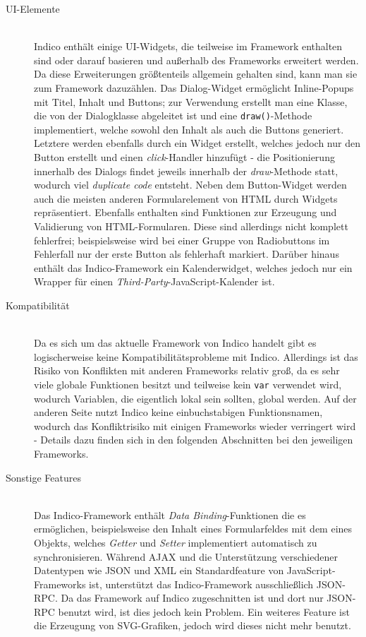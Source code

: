 \begin{description}
\item[UI-Elemente] \hfill \\
Indico enthält einige UI-Widgets, die teilweise im Framework enthalten sind oder darauf basieren und
außerhalb des Frameworks erweitert werden. Da diese Erweiterungen größtenteils allgemein gehalten
sind, kann man sie zum Framework dazuzählen. Das Dialog-Widget ermöglicht Inline-Popups mit Titel,
Inhalt und Buttons; zur Verwendung erstellt man eine Klasse, die von der Dialogklasse abgeleitet
ist und eine \lstinline{draw()}-Methode implementiert, welche sowohl den Inhalt als auch die Buttons
generiert. Letztere werden ebenfalls durch ein Widget erstellt, welches jedoch nur den Button
erstellt und einen \emph{click}-Handler hinzufügt - die Positionierung innerhalb des Dialogs findet
jeweils innerhalb der \emph{draw}-Methode statt, wodurch viel \emph{duplicate code} entsteht.
Neben dem Button-Widget werden auch die meisten anderen Formularelement von HTML durch Widgets
repräsentiert. Ebenfalls enthalten sind Funktionen zur Erzeugung und Validierung von
HTML-Formularen. Diese sind allerdings nicht komplett fehlerfrei; beispielsweise wird bei einer
Gruppe von Radiobuttons im Fehlerfall nur der erste Button als fehlerhaft markiert. Darüber hinaus
enthält das Indico-Framework ein Kalenderwidget, welches jedoch nur ein Wrapper für einen
\emph{Third-Party}-JavaScript-Kalender ist.

\item[Kompatibilität] \hfill \\
Da es sich um das aktuelle Framework von Indico handelt gibt es logischerweise keine
Kompatibilitätsprobleme mit Indico. Allerdings ist das Risiko von Konflikten mit anderen Frameworks
relativ groß, da es sehr viele globale Funktionen besitzt und teilweise kein \lstinline{var}
verwendet wird, wodurch Variablen, die eigentlich lokal sein sollten, global werden. Auf der anderen
Seite nutzt Indico keine einbuchstabigen Funktionsnamen, wodurch das Konfliktrisiko mit einigen
Frameworks wieder verringert wird - Details dazu finden sich in den folgenden Abschnitten bei den
jeweiligen Frameworks.

\item[Sonstige Features] \hfill \\
Das Indico-Framework enthält \emph{Data Binding}-Funktionen die es ermöglichen, beispielsweise den
Inhalt eines Formularfeldes mit dem eines Objekts, welches \emph{Getter} und \emph{Setter}
implementiert automatisch zu synchronisieren. Während AJAX und die Unterstützung verschiedener
Datentypen wie JSON und XML ein Standardfeature von JavaScript-Frameworks ist, unterstützt das
Indico-Framework ausschließlich JSON-RPC. Da das Framework auf Indico zugeschnitten ist und dort nur
JSON-RPC benutzt wird, ist dies jedoch kein Problem. Ein weiteres Feature ist die Erzeugung von
SVG-Grafiken, jedoch wird dieses nicht mehr benutzt.


\end{description}
